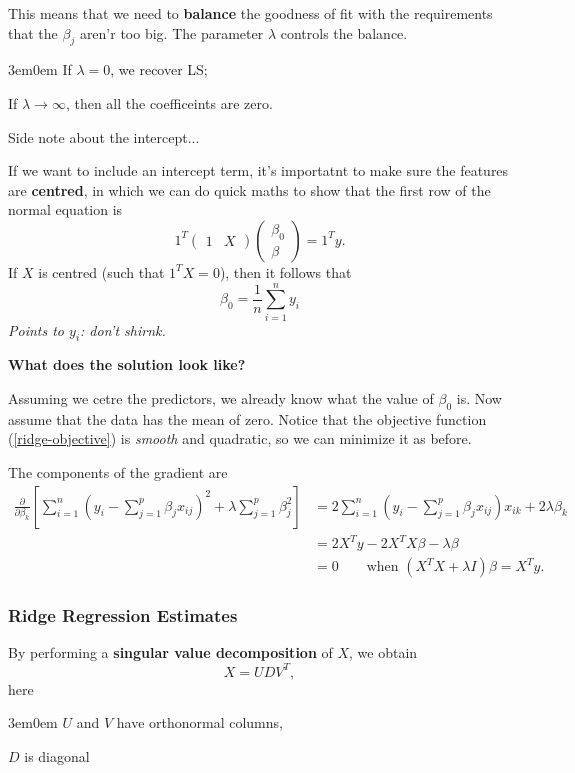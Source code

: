\documentclass[11pt]{article}
\newenvironment{indentone}{\begin{adjustwidth}{3em}{0em}}{\end{adjustwidth}}
\theoremstyle{definition}
\numberwithin{equation}{section}
\begin{document}
This means that we need to \textbf{balance} the goodness of fit with the requirements that the $\beta_j$ aren'r too big. The parameter $\lambda$ controls the balance. 
\begin{indentone}
If $\lambda = 0$, we recover LS;

If $\lambda\to\infty$, then all the coefficeints are zero.
\end{indentone}
\begin{writenotes}
  Side note about the intercept...

  If we want to include an intercept term, it's importatnt to make sure the features are \textbf{centred}, in which we can do quick maths to show that the first row of the normal equation is
  \begin{equation}
    1^T
    \begin{pmatrix}
      1&X
    \end{pmatrix}
    \begin{pmatrix}
      \beta_0\\
      \beta
    \end{pmatrix}
    =1^Ty.
  \end{equation}
  If $X$ is centred (such that $1^TX=0$), then it follows that
  \begin{equation}
    \beta_0=\frac{1}{n} \sum^n_{i=1}y_i
  \end{equation}
  \textit{Points to $y_i$: don't shirnk.}
\end{writenotes}

\textbf{What does the solution look like?}

Assuming we cetre the predictors, we already know what the value of $\beta_0$ is. Now assume that the data has the mean of zero. Notice that the objective function (\ref{ridge-objective}) is \textit{smooth} and quadratic, so we can minimize it as before.

The components of the gradient are
\begin{align}
  \frac{\partial}{\partial\beta_k}\left[ \sum^n_{i=1}\left( y_i-\sum^p_{j=1}\beta_jx_{ij} \right)^2+\lambda\sum^p_{j=1}\beta_j^2 \right]
  &=2\sum^n_{i=1}\left( y_i-\sum^p_{j=1}\beta_jx_{ij} \right)x_{ik}+2\lambda\beta_k\\
  &=2X^Ty-2X^TX\beta-\lambda\beta\\
  &=0\qquad\text{when }(X^TX+\lambda I)\beta=X^Ty.
\end{align}

\subsubsection{Ridge Regression Estimates}
By performing a \textbf{singular value decomposition} of $X$, we obtain
\begin{equation}
  X=UDV^T,
\end{equation}
here
\begin{indentone}
  $U$ and $V$ have orthonormal columns,

  $D$ is diagonal
\end{indentone}
\end{document}
